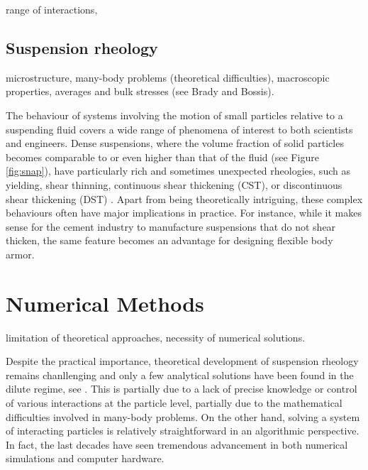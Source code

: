 range of interactions,


\section{Suspension rheology}

microstructure,
many-body problems (theoretical difficulties),
macroscopic properties, averages and bulk stresses (see Brady and Bossis).

The behaviour of systems involving the motion of small particles relative to a suspending fluid covers a wide range of phenomena of interest to both scientists and engineers. Dense suspensions, where the volume fraction of solid particles becomes comparable to or even higher than that of the fluid (see Figure \ref{fig:snap}), have particularly rich and sometimes unexpected rheologies, such as yielding, shear thinning, continuous shear thickening (CST), or discontinuous shear thickening (DST) \citep{mewis_wagner_book, Morton_Morris_2014, guazzelli_pouliquen_2018, Morris_annurev2020}. Apart from being theoretically intriguing, these complex behaviours often have major implications in practice. For instance, while it makes sense for the cement industry to manufacture suspensions that do not shear thicken, the same feature becomes an advantage for designing flexible body armor.



\chapter{Numerical Methods}



limitation of theoretical approaches,
necessity of numerical solutions.

Despite the practical importance, theoretical development of suspension rheology remains chanllenging and only a few analytical solutions have been found in the dilute regime, see \eg \cite{Einstein_1906, batchelor_green_1972b}. This is partially due to a lack of precise knowledge or control of various interactions at the particle level, partially due to the mathematical difficulties involved in many-body problems. On the other hand, solving a system of interacting particles is relatively straightforward in an algorithmic perspective. In fact, the last decades have seen tremendous advancement in both numerical simulations and computer hardware.

